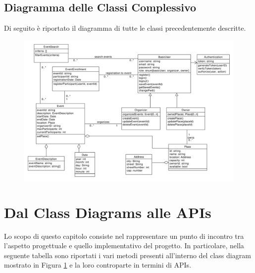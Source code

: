 \documentclass[9pt]{extarticle}
\begin{document}
\subsection{Diagramma delle Classi Complessivo}

Di seguito è riportato il diagramma di tutte le classi precedentemente descritte.

\begin{figure}[!htb]
	\centering
	\includegraphics[width=\linewidth]{./images/classDiagram.pdf}
	\caption{}
	\label{fig:classDiagram}
\end{figure}

\newpage
\section{Dal Class Diagrams alle APIs}

Lo scopo di questo capitolo consiste nel rappresentare un punto di incontro tra l'aspetto progettuale e quello implementativo del progetto. In particolare, nella seguente tabella sono riportati i vari metodi presenti all'interno del class diagram mostrato in Figura \ref{fig:classDiagram} e la loro controparte in termini di APIs. 
\end{document}
